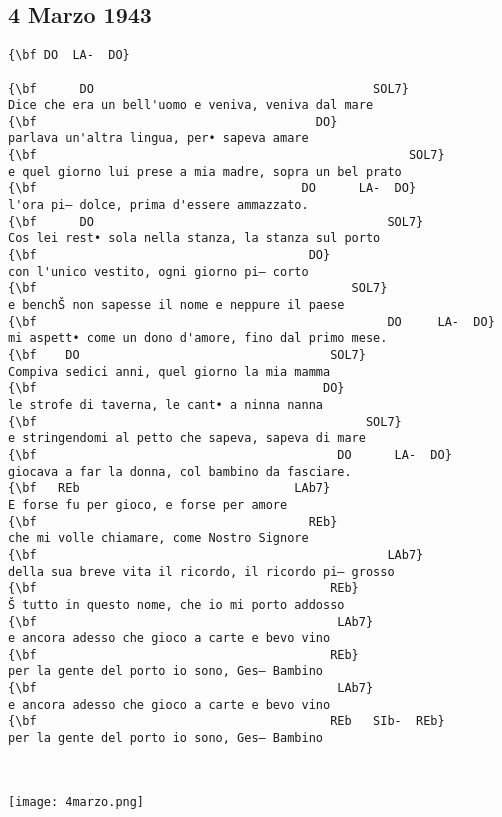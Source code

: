 \documentclass[a4paper]{article}
\begin{document}
\subsection{4 Marzo 1943} %
\label{sub:4 Marzo 1943}
\begin{Verbatim}[commandchars=\\\{\}]
{\bf DO  LA-  DO}

{\bf      DO                                       SOL7}
Dice che era un bell'uomo e veniva, veniva dal mare
{\bf                                       DO}
parlava un'altra lingua, per• sapeva amare
{\bf                                                    SOL7}
e quel giorno lui prese a mia madre, sopra un bel prato
{\bf                                     DO      LA-  DO}
l'ora pi— dolce, prima d'essere ammazzato.
{\bf      DO                                         SOL7}
Cos lei rest• sola nella stanza, la stanza sul porto
{\bf                                      DO}
con l'unico vestito, ogni giorno pi— corto
{\bf                                            SOL7}
e benchŠ non sapesse il nome e neppure il paese
{\bf                                                 DO     LA-  DO}
mi aspett• come un dono d'amore, fino dal primo mese.
{\bf    DO                                   SOL7}
Compiva sedici anni, quel giorno la mia mamma
{\bf                                        DO}
le strofe di taverna, le cant• a ninna nanna
{\bf                                              SOL7}
e stringendomi al petto che sapeva, sapeva di mare
{\bf                                          DO      LA-  DO}
giocava a far la donna, col bambino da fasciare.
{\bf   REb                              LAb7}
E forse fu per gioco, e forse per amore
{\bf                                      REb}
che mi volle chiamare, come Nostro Signore
{\bf                                                 LAb7}
della sua breve vita il ricordo, il ricordo pi— grosso
{\bf                                         REb}
Š tutto in questo nome, che io mi porto addosso
{\bf                                          LAb7}
e ancora adesso che gioco a carte e bevo vino
{\bf                                         REb}
per la gente del porto io sono, Ges— Bambino
{\bf                                          LAb7}
e ancora adesso che gioco a carte e bevo vino
{\bf                                         REb   SIb-  REb}
per la gente del porto io sono, Ges— Bambino
\end{Verbatim}
\newpage
\vspace{10cm} \\
\centerline{\texttt{[image: 4marzo.png]}}
\newpage
\end{document}
